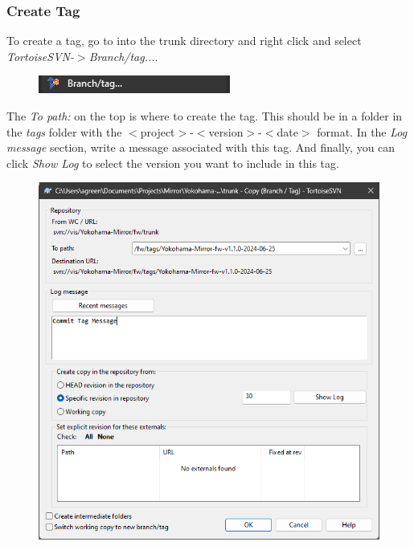 \documentclass[10pt]{article}
\begin{document}
            \subsubsection{Create Tag}
                To create a tag, go to into the trunk directory and right click and select \emph{TortoiseSVN-$>$Branch/tag...}.
                \begin{figure}[H]
                    \centerline{\includegraphics{References/Tag.png}}
                \end{figure}
                The \emph{To path:} on the top is where to create the tag. This should be in a folder in the \emph{tags} folder with the $<$project$>$-$<$version$>$-$<$date$>$ format. In the \emph{Log message} section, write a message associated with this tag. And finally, you can click \emph{Show Log} to select the version you want to include in this tag.
                \begin{figure}[H]
                    \centerline{\includegraphics[width=\textwidth]{References/Tag Window.png}}
                \end{figure}
\end{document}
